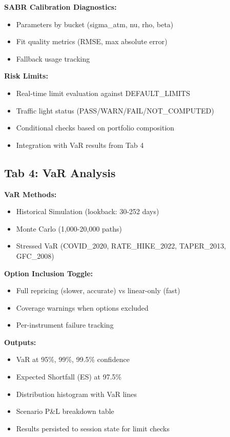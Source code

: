 \documentclass[12pt,a4paper]{report}
\begin{document}
\textbf{SABR Calibration Diagnostics:}
\begin{itemize}
    \item Parameters by bucket (sigma\_atm, nu, rho, beta)
    \item Fit quality metrics (RMSE, max absolute error)
    \item Fallback usage tracking
\end{itemize}

\textbf{Risk Limits:}
\begin{itemize}
    \item Real-time limit evaluation against DEFAULT\_LIMITS
    \item Traffic light status (PASS/WARN/FAIL/NOT\_COMPUTED)
    \item Conditional checks based on portfolio composition
    \item Integration with VaR results from Tab 4
\end{itemize}

\subsection{Tab 4: VaR Analysis}

\textbf{VaR Methods:}
\begin{itemize}
    \item Historical Simulation (lookback: 30-252 days)
    \item Monte Carlo (1,000-20,000 paths)
    \item Stressed VaR (COVID\_2020, RATE\_HIKE\_2022, TAPER\_2013, GFC\_2008)
\end{itemize}

\textbf{Option Inclusion Toggle:}
\begin{itemize}
    \item Full repricing (slower, accurate) vs linear-only (fast)
    \item Coverage warnings when options excluded
    \item Per-instrument failure tracking
\end{itemize}

\textbf{Outputs:}
\begin{itemize}
    \item VaR at 95\%, 99\%, 99.5\% confidence
    \item Expected Shortfall (ES) at 97.5\%
    \item Distribution histogram with VaR lines
    \item Scenario P\&L breakdown table
    \item Results persisted to session state for limit checks
\end{itemize}
\end{document}
